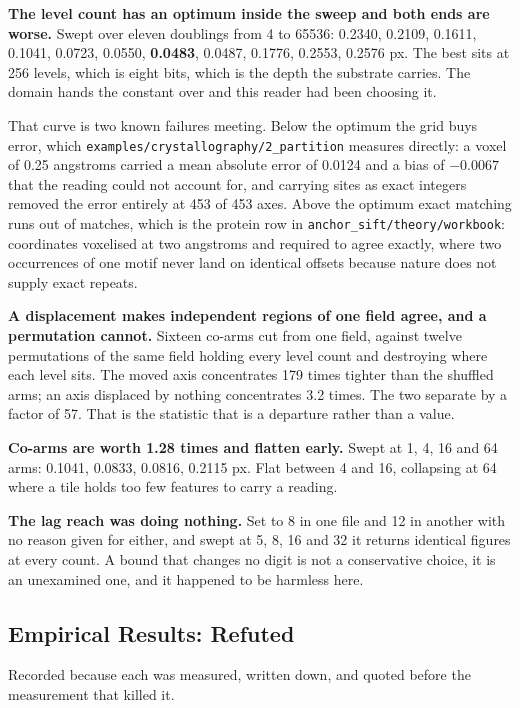 \textbf{The level count has an optimum inside the sweep and both ends are worse.} Swept over eleven
doublings from 4 to 65536: 0.2340, 0.2109, 0.1611, 0.1041, 0.0723, 0.0550, \textbf{0.0483}, 0.0487,
0.1776, 0.2553, 0.2576 px. The best sits at 256 levels, which is eight bits, which is the depth the
substrate carries. The domain hands the constant over and this reader had been choosing it.

That curve is two known failures meeting. Below the optimum the grid buys error, which
\texttt{examples/\allowbreak{}crystallography/\allowbreak{}2\_\allowbreak{}partition} measures
directly: a voxel of 0.25 angstroms carried a mean absolute error of 0.0124 and a bias of $-0.0067$
that the reading could not account for, and carrying sites as exact integers removed the error
entirely at 453 of 453 axes. Above the optimum exact matching runs out of matches, which is the
protein row in \texttt{anchor\_sift/\allowbreak{}theory/\allowbreak{}workbook}: coordinates
voxelised at two angstroms and required to agree exactly, where two occurrences of one motif never
land on identical offsets because nature does not supply exact repeats.

\textbf{A displacement makes independent regions of one field agree, and a permutation cannot.}
Sixteen co-arms cut from one field, against twelve permutations of the same field holding every
level count and destroying where each level sits. The moved axis concentrates 179 times tighter than
the shuffled arms; an axis displaced by nothing concentrates 3.2 times. The two separate by a factor
of 57. That is the statistic that is a departure rather than a value.

\textbf{Co-arms are worth 1.28 times and flatten early.} Swept at 1, 4, 16 and 64 arms: 0.1041,
0.0833, 0.0816, 0.2115 px. Flat between 4 and 16, collapsing at 64 where a tile holds too few
features to carry a reading.

\textbf{The lag reach was doing nothing.} Set to 8 in one file and 12 in another with no reason
given for either, and swept at 5, 8, 16 and 32 it returns identical figures at every count. A bound
that changes no digit is not a conservative choice, it is an unexamined one, and it happened to be
harmless here.

\subsection{Empirical Results: Refuted}

Recorded because each was measured, written down, and quoted before the measurement that killed it.

